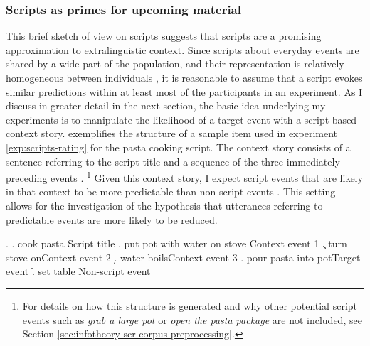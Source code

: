 \subsubsection{Scripts as primes for upcoming material}
This brief sketch of  view on scripts suggests that scripts are a promising approximation to extralinguistic context. Since scripts about everyday events are shared by a wide part of the population, and their representation is relatively homogeneous between individuals \citep{bower.etal1979}, it is reasonable to assume that a script evokes similar predictions within at least most of the participants in an experiment. As I discuss in greater detail in the next section, the basic idea underlying my experiments is to manipulate the likelihood of a target event with a script-based context story. \Next exemplifies the structure of a sample item used in experiment \ref{exp:scripts-rating} for the pasta cooking script. The context story consists of a  sentence referring to the script title \Next[a] and a sequence of the three immediately preceding events \Next[b--d].%
%
\footnote{For details on how this structure is generated and why other potential script events such as \textit{grab a large pot} or \textit{open the pasta package} are not included, see Section \ref{sec:infotheory-scr-corpus-preprocessing}.}\afterfn%
%
Given this context story, I expect script events \Next[e] that are likely in that context to be more predictable than non-script events \Next[f]. This setting allows for the investigation of the hypothesis that utterances referring to predictable events are more likely to be reduced.

\ex.  \label{ex:scripts-item-abstract}
\a. cook pasta \hfill Script title
    \b. put pot with water on stove \hfill Context event 1
    \c. turn stove on\hfill Context event 2
    \d. water boils\hfill Context event 3
    \e. pour pasta into pot\hfill Target event
    \f. set table \hfill Non-script event

